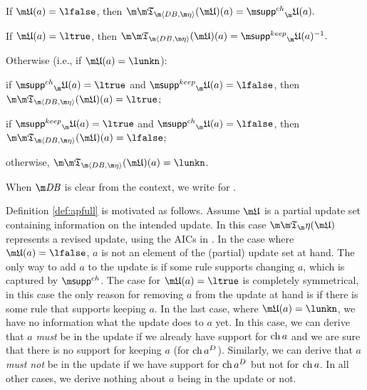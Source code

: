 \begin{definition}
% 
\begin{compactitem}
 \item If $\UUU(a)=\lfalse$, then $\Apfull(\UUU)(a) = \suppin_\UUU(a).$
 \item If $\UUU(a)=\ltrue$, then $\Apfull(\UUU)(a) = \suppout_\UUU(a)^{-1}.$
 \item Otherwise (i.e., if $\UUU(a) = \lunkn$):
  \begin{compactitem}
    \item if $\suppin_\UUU(a) = \ltrue$ and $\suppout_\UUU(a)=\lfalse$, then $\Apfull(\UUU)(a)=\ltrue$;
    \item if $\suppout_\UUU(a) = \ltrue$ and $\suppin_\UUU(a)=\lfalse$, then $\Apfull(\UUU)(a)=\lfalse$;
    \item otherwise, $\Apfull(\UUU)(a)=\lunkn$.
\end{compactitem}

\end{compactitem}
When $\db$ is clear from the context, we write \Ap for \Apfull.
 
\end{definition}

Definition \ref{def:apfull} is motivated as follows. Assume $\UUU$ is a partial update set containing information on the intended update. In this case $\Ap(\UUU)$ represents a revised update, using the AICs in \aics. 
In the case where $\UUU(a)=\lfalse$, $a$ is not an element of the (partial) update set at hand. The only way to add $a$ to the update is if some rule supports changing $a$, which is captured by $\suppin$. 
The case for $\UUU(a)=\ltrue$ is completely symmetrical, in this case the only reason for removing $a$ from the update at hand is if there is some rule that supports keeping $a$.
In the last case, where $\UUU(a)=\lunkn$, we have no information what the update does to $a$ yet. In this case, we can derive that $a$ \emph{must} be in the update if we already have support for $\operatorname{ch} a$ and we are sure that there is no support for keeping $a$ (for $\operatorname{ch} a^D$). Similarly, we can derive that $a$ \emph{must not} be in the update if we have support for $\operatorname{ch} a^D$ but not for $\operatorname{ch} a$. 
In all other cases, we derive nothing about $a$ being in the update or not. 


